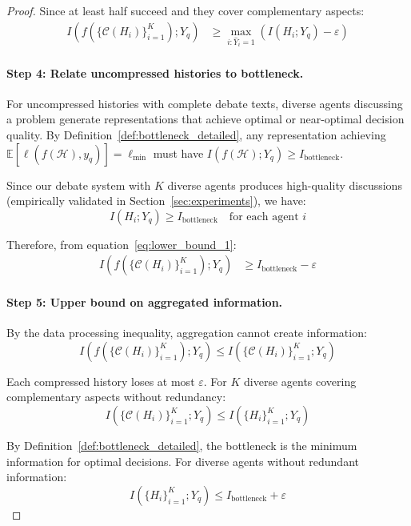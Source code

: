 \documentclass{article}
\theoremstyle{plain}
\theoremstyle{definition}
\theoremstyle{remark}
\begin{document}
\begin{proof}
Since at least half succeed and they cover complementary aspects:
\begin{align}
I(f(\{\mathcal{C}(H_i)\}_{i=1}^K); Y_q) &\geq \max_{i : \hat{Y}_i=1} (I(H_i; Y_q) - \varepsilon) \label{eq:lower_bound_1}
\end{align}

\paragraph{Step 4: Relate uncompressed histories to bottleneck.}

For uncompressed histories with complete debate texts, diverse agents discussing a problem generate representations that achieve optimal or near-optimal decision quality. By Definition~\ref{def:bottleneck_detailed}, any representation achieving $\mathbb{E}[\ell(f(\mathcal{H}), y_q)] = \ell_{\min}$ must have $I(f(\mathcal{H}); Y_q) \geq I_{\text{bottleneck}}$.

Since our debate system with $K$ diverse agents produces high-quality discussions (empirically validated in Section~\ref{sec:experiments}), we have:
\begin{equation}
I(H_i; Y_q) \geq I_{\text{bottleneck}} \quad \text{for each agent } i
\end{equation}

Therefore, from equation~\eqref{eq:lower_bound_1}:
\begin{align}
I(f(\{\mathcal{C}(H_i)\}_{i=1}^K); Y_q) &\geq I_{\text{bottleneck}} - \varepsilon \label{eq:lower_bound_2}
\end{align}

\paragraph{Step 5: Upper bound on aggregated information.}

By the data processing inequality, aggregation cannot create information:
\begin{equation}
I(f(\{\mathcal{C}(H_i)\}_{i=1}^K); Y_q) \leq I(\{\mathcal{C}(H_i)\}_{i=1}^K; Y_q)
\end{equation}

Each compressed history loses at most $\varepsilon$. For $K$ diverse agents covering complementary aspects without redundancy:
\begin{equation}
I(\{\mathcal{C}(H_i)\}_{i=1}^K; Y_q) \leq I(\{H_i\}_{i=1}^K; Y_q)
\end{equation}

By Definition~\ref{def:bottleneck_detailed}, the bottleneck is the minimum information for optimal decisions. For diverse agents without redundant information:
\begin{equation}
I(\{H_i\}_{i=1}^K; Y_q) \leq I_{\text{bottleneck}} + \varepsilon
\end{equation}


\end{proof}
\end{document}
